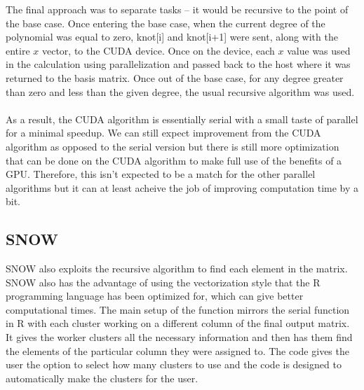 The final approach was to separate tasks – it would be recursive to the point of the base case. Once entering the base case, when the current degree of the polynomial was equal to zero, knot[i] and knot[i+1] were sent, along with the entire $x$ vector, to the CUDA device. Once on the device, each $x$ value was used in the calculation using parallelization and passed back to the host where it was returned to the basis matrix. Once out of the base case, for any degree greater than zero and less than the given degree, the usual recursive algorithm was used.
\\ \\
As a result, the CUDA algorithm is essentially serial with a small taste of parallel for a minimal speedup. We can still expect improvement from the CUDA algorithm as opposed to the serial version but there is still more optimization that can be done on the CUDA algorithm to make full use of the benefits of a GPU. Therefore, this isn't expected to be a match for the other parallel algorithms but it can at least acheive the job of improving computation time by a bit.


\subsection{SNOW}
SNOW also exploits the recursive algorithm to find each element in the matrix. SNOW also has the advantage of using the vectorization style that the R programming language has been optimized for, which can give better computational times. The main setup of the function mirrors the serial function in R with each cluster working on a different column of the final output matrix. It gives the worker clusters all the necessary information and then has them find the elements of the particular column they were assigned to. The code gives the user the option to select how many clusters to use and the code is designed to automatically make the clusters for the user.
